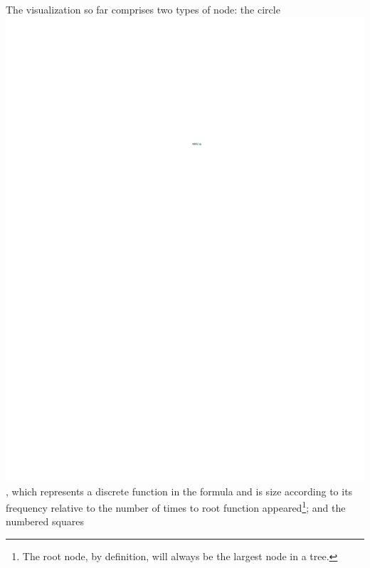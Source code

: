 \documentclass[conference]{IEEEtran}
\begin{document}
	The visualization so far comprises two types of node: the circle
	\includegraphics{glossary-greenonly}, which represents a discrete function in
	the formula and is size according to its frequency relative to the number of
	times to root function appeared\footnote{The root node, by definition, will
		always be the largest node in a tree.}; and the numbered squares
\end{document}

